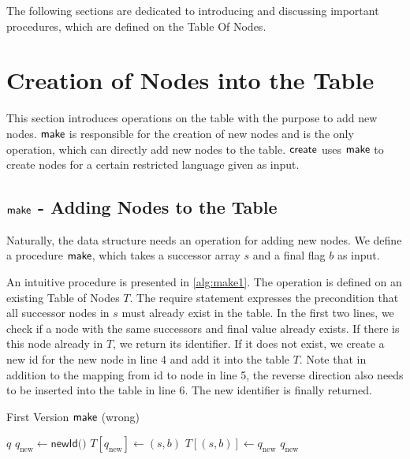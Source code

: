 \par 

The following sections are dedicated to introducing and discussing important procedures, which are defined on the Table Of Nodes. 

\section{Creation of Nodes into the Table}
This section introduces operations on the table with the purpose to add new nodes. $\operatorname{\textsf{make}}$ is responsible for the creation of new nodes and is the only operation, which can directly add new nodes to the table. $\operatorname{\textsf{create}}$ uses $\operatorname{\textsf{make}}$ to create nodes for a certain restricted language given as input.

\subsection{$\operatorname{\textsf{make}}$ - Adding Nodes to the Table}
Naturally, the data structure needs an operation for adding new nodes. We define a procedure $\operatorname{\textsf{make}}$, which takes a successor array $s$ and a final flag $b$ as input. 

An intuitive procedure is presented in \autoref{alg:make1}.
The operation is defined on an existing Table of Nodes $T$.
The require statement expresses the precondition that all successor nodes in $s$ must already exist in the table. In the first two lines, we check if a node with the same successors and final value already exists. If there is this node already in $T$, we return its identifier. If it does not exist, we create a new id for the new node in line 4 and add it into the table $T$. Note that in addition to the mapping from id to node in line 5, the reverse direction also needs to be inserted into the table in line 6. The new identifier is finally returned.

\begin{algorithm}
\caption{First Version $\operatorname{\textsf{make}}$ (wrong)}\label{alg:make1}
\begin{algorithmic}[1]\smallskip
{}
\Return $q$
\Else
\State $q_{\text{new}} \gets \textsf{newId()}$
\State $T[q_{\text{new}}] \gets (s,b)$
\State $T[(s,b)] \gets q_{\text{new}}$
\Return $q_{\text{new}}$
\EndIf
\end{algorithmic}
\end{algorithm}

